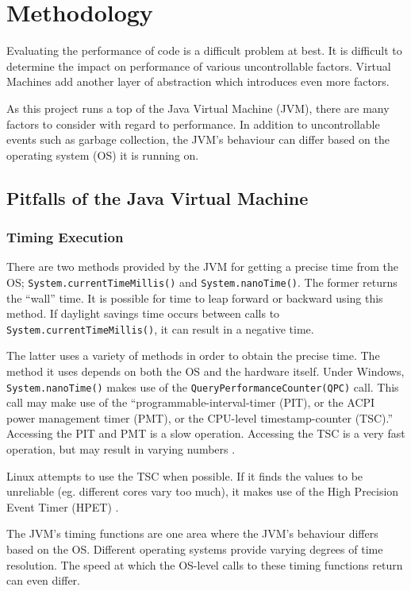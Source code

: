\documentclass[12pt,letterpaper,oneside]{report}
\theoremstyle{definition}
\begin{document}
		\section{Methodology}
			Evaluating the performance of code is a difficult problem at best.  It is difficult to determine the impact on performance of various uncontrollable factors.  Virtual Machines add another layer of abstraction which introduces even more factors.
			
			As this project runs a top of the Java Virtual Machine (JVM), there are many factors to consider with regard to performance.  In addition to uncontrollable events such as garbage collection, the JVM's behaviour can differ based on the operating system (OS) it is running on.
			
			\subsection{Pitfalls of the Java Virtual Machine}
				
				\subsubsection{Timing Execution}
					There are two methods provided by the JVM for getting a precise time from the OS; \texttt{System.currentTimeMillis()} and \texttt{System.nanoTime()}.  The former returns the ``wall'' time.  It is possible for time to leap forward or backward using this method.  If daylight savings time occurs between calls to \texttt{System.currentTimeMillis()}, it can result in a negative time.
					
					The latter uses a variety of methods in order to obtain the precise time.  The method it uses depends on both the OS and the hardware itself.  Under Windows, \texttt{System.nanoTime()} makes use of the \texttt{QueryPerformanceCounter(QPC)} call.  This call may make use of the ``programmable-interval-timer (PIT), or the ACPI power management timer (PMT), or the CPU-level timestamp-counter (TSC).'' \cite{hotspot-timer-06}  Accessing the PIT and PMT is a slow operation.  Accessing the TSC is a very fast operation, but may result in varying numbers \cite{linux-tsc-06}.
					
					Linux attempts to use the TSC when possible.  If it finds the values to be unreliable (eg. different cores vary too much), it makes use of the High Precision Event Timer (HPET) \cite{linux-tsc-06}.
					
				The JVM's timing functions are one area where the JVM's behaviour differs based on the OS.  Different operating systems provide varying degrees of time resolution.  The speed at which the OS-level calls to these timing functions return can even differ.
				
\end{document}
